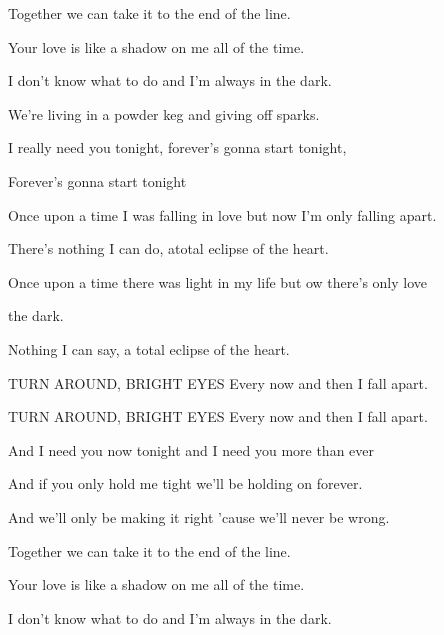 Together we can take it to the end of the line.

Your love is like a shadow on me all of the time.

I don't know what to do and I'm always in the dark.

We're living in a powder keg and giving off sparks.

I really need you tonight, forever's gonna start tonight,

Forever's gonna start tonight

Once upon a time I was falling in love but now I'm only falling apart.

There's nothing I can do, atotal eclipse of the heart.

  

Once upon a time there was light in my life but ow there's only love

the dark.

Nothing I can say, a total eclipse of the heart.

 

 

 

 

TURN AROUND, BRIGHT EYES Every now and then I fall apart.

TURN AROUND, BRIGHT EYES Every now and then I fall apart.

And I need you now tonight and I need you more than ever

And if you only hold me tight we'll be holding on forever.

And we'll only be making it right 'cause we'll never be wrong.

Together we can take it to the end of the line.

Your love is like a shadow on me all of the time.

I don't know what to do and I'm always in the dark.

